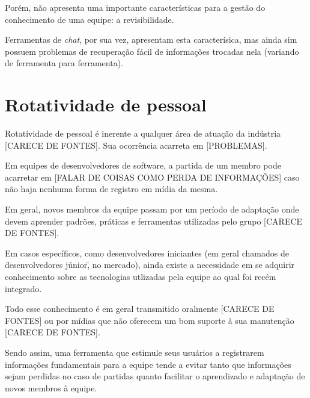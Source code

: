 Porém, não apresenta uma importante características para a gestão do conhecimento de uma equipe: a revisibilidade.

Ferramentas de \textit{chat}, por sua vez, apresentam esta caracterísica, mas ainda sim possuem problemas de recuperação fácil de informações trocadas nela (variando de ferramenta para ferramenta).

\section{Rotatividade de pessoal}

Rotatividade de pessoal é inerente a qualquer área de atuação da indústria [CARECE DE FONTES].
Sua ocorrência acarreta em [PROBLEMAS].

Em equipes de desenvolvedores de software, a partida de um membro pode acarretar em [FALAR DE COISAS COMO PERDA DE INFORMAÇÕES] caso não haja nenhuma forma de registro em mídia da mesma.

Em geral, novos membros da equipe passam por um período de adaptação onde devem aprender padrões, práticas e ferramentas utilizadas pelo grupo [CARECE DE FONTES].



Em casos específicos, como desenvolvedores iniciantes (em geral chamados de \"desenvolvedores júnior\", no mercado), ainda existe a necessidade em se adquirir conhecimento sobre as tecnologias utlizadas pela equipe ao qual foi recém integrado.

Todo esse conhecimento é em geral transmitido oralmente [CARECE DE FONTES] ou por mídias que não oferecem um bom suporte à sua manutenção [CARECE DE FONTES].

Sendo assim, uma ferramenta que estimule seus usuários a registrarem informações fundamentais para a equipe tende a evitar tanto que informações sejam perdidas no caso de partidas quanto facilitar o aprendizado e adaptação de novos membros à equipe.

